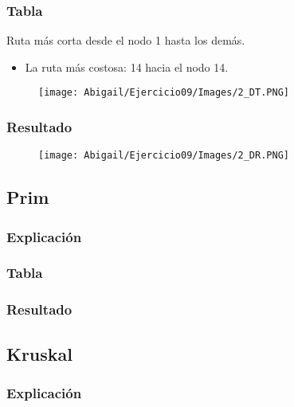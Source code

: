 \documentclass[12pt]{article}
\begin{document}
      \subsubsection{Tabla}
        Ruta más corta desde el nodo 1 hasta los demás.

        \begin{itemize}
          \item La ruta más costosa: 14 hacia el nodo 14.
        \end{itemize}
        
        \begin{figure}[h!]
          \centering
          \texttt{[image: Abigail/Ejercicio09/Images/2\_DT.PNG]}
        \end{figure} 

      \subsubsection{Resultado}
        \begin{figure}[h!]
          \centering
          \texttt{[image: Abigail/Ejercicio09/Images/2\_DR.PNG]}
        \end{figure} 


    \subsection{Prim}

      \subsubsection{Explicación}

      \subsubsection{Tabla}

      \subsubsection{Resultado}

    \subsection{Kruskal}

      \subsubsection{Explicación}
\end{document}
